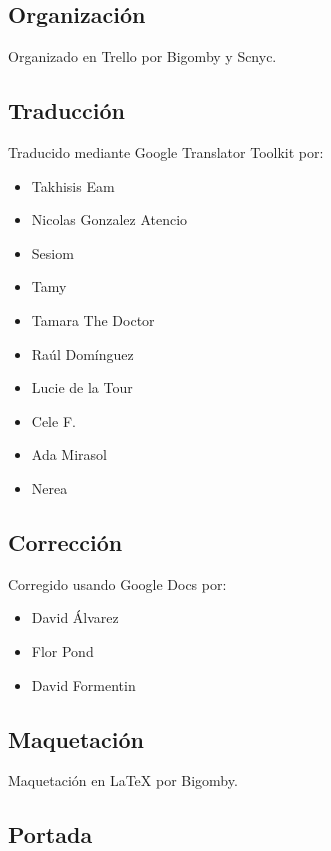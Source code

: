 \subsection*{Organización}\label{organizaciuxf3n}

Organizado en Trello por Bigomby y Scnyc.

\subsection*{Traducción}\label{traducciuxf3n}

Traducido mediante Google Translator Toolkit por:

\begin{itemize}
\itemsep1pt\parskip0pt
\item
  Takhisis Eam
\item
  Nicolas Gonzalez Atencio
\item
  Sesiom
\item
  Tamy
\item
  Tamara The Doctor
\item
  Raúl Domínguez
\item
  Lucie de la Tour
\item
  Cele F.
\item
  Ada Mirasol
\item
  Nerea
\end{itemize}

\subsection*{Corrección}\label{correcciuxf3n}

Corregido usando Google Docs por:

\begin{itemize}
\itemsep1pt\parskip0pt
\item
  David Álvarez
\item
  Flor Pond
\item
  David Formentin
\end{itemize}

\subsection*{Maquetación}\label{maquetaciuxf3n}

Maquetación en LaTeX por Bigomby.

\subsection*{Portada}\label{portada}

